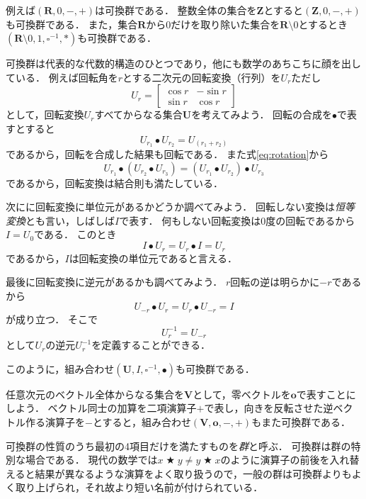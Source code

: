 \documentclass[twocolumn]{jsbook}
\newcommand{\mathAnyBinaryOperator}{\mathop{\bigstar}}
\newcommand{\mathSomething}{\square}
\newcommand{\mathSet}[1]{\mathbf{#1}}
\newcommand{\mathVector}[1]{\boldsymbol{#1}}
\newcommand{\mathGroup}[4]{(#1,#2,#3,#4)}
\newcommand{\keyword}[1]{\emph{#1}}
\begin{document}
例えば$\mathGroup{\mathSet{R}}{0}{-}{+}$は可換群である．
整数全体の集合を$\mathSet{Z}$とすると$\mathGroup{\mathSet{Z}}{0}{-}{+}$も可換群である．
また，集合$\mathSet{R}$から$0$だけを取り除いた集合を$\mathSet{R}\setminus0$とするとき$\mathGroup{\mathSet{R}\setminus0}{1}{\mathSomething^{-1}}{*}$も可換群である．

可換群は代表的な代数的構造のひとつであり，他にも数学のあちこちに顔を出している．
例えば回転角を$r$とする二次元の回転変換（行列）を$U_r$ただし$$U_r=\begin{bmatrix}\cos r&-\sin r\\\sin r&\cos r\end{bmatrix}$$として，回転変換$U_r$すべてからなる集合$\mathSet{U}$を考えてみよう．
回転の合成を$\bullet$で表すとすると
\begin{equation}
\label{eq:rotation}
U_{r_1}\bullet U_{r_2}=U_{(r_1+r_2)}
\end{equation}
であるから，回転を合成した結果も回転である．
また式\eqref{eq:rotation}から$$U_{r_1}\bullet\left(U_{r_2}\bullet U_{r_3}\right)=\left(U_{r_1}\bullet U_{r_2}\right)\bullet U_{r_3}$$
であるから，回転変換は結合則も満たしている．

次にに回転変換に単位元があるかどうか調べてみよう．
回転しない変換は\keyword{恒等変換}とも言い，しばしば$I$で表す．
何もしない回転変換は$0$度の回転であるから$I=U_0$である．
このとき$$I\bullet U_r=U_r\bullet I=U_r$$であるから，$I$は回転変換の単位元であると言える．

最後に回転変換に逆元があるかも調べてみよう．
$r$回転の逆は明らかに$-r$であるから$$U_{-r}\bullet U_r=U_r\bullet U_{-r}=I$$が成り立つ．
そこで$$U_{r}^{-1}=U_{-r}$$として$U_r$の逆元$U_r^{-1}$を定義することができる．

このように，組み合わせ$\mathGroup{\mathSet{U}}{I}{\mathSomething^{-1}}{\bullet}$も可換群である．

任意次元のベクトル全体からなる集合を$\mathSet{V}$として，零ベクトルを$\mathVector{o}$で表すことにしよう．
ベクトル同士の加算を二項演算子$+$で表し，向きを反転させた逆ベクトル作る演算子を$-$とすると，組み合わせ$\mathGroup{\mathSet{V}}{\mathVector{o}}{-}{+}$もまた可換群である．

可換群の性質のうち最初の4項目だけを満たすものを\keyword{群}と呼ぶ．
可換群は群の特別な場合である．
現代の数学では$x\mathAnyBinaryOperator y\neq y\mathAnyBinaryOperator x$のように演算子の前後を入れ替えると結果が異なるような演算をよく取り扱うので，一般の群は可換群よりもよく取り上げられ，それ故より短い名前が付けられている．
\end{document}

